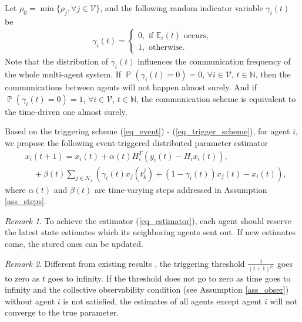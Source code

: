 \documentclass[10pt,journal,final]{IEEEtran}
\DeclareMathOperator{\Pro}{\mathbb{P}}
\theoremstyle{plain}
\theoremstyle{definition}
\theoremstyle{remark}
\newtheorem{remark}{Remark}[section]
\begin{document}
Let $\rho_0=\min\{\rho_j,\forall j\in\mathcal{V}\}$, and the following  random indicator variable $\gamma_i(t)$ be
\begin{align}\label{eq_trigger_scheme}
\gamma_i(t)=\begin{cases}
0, \text{ if } \mathbb{E}_{i}(t) \text{ occurs},\\
1, \text{ otherwise}.
\end{cases}
\end{align}
Note that the distribution of $\gamma_i(t)$ influences the communication frequency of the whole multi-agent system. If $\Pro(\gamma_i(t)=0)=0$, $\forall i\in\mathcal{V}$, $t\in\mathbb{N}$, then the communications between agents will not happen almost surely. And if $\Pro(\gamma_i(t)=0)=1$, $\forall i\in\mathcal{V}$, $t\in\mathbb{N}$, the communication scheme is equivalent  to the time-driven one almost surely.

Based on the triggering scheme (\ref{eq_event}) - (\ref{eq_trigger_scheme}),  for agent $i$, we propose the following event-triggered distributed parameter estimator
\begin{align}\label{eq_estimator}
&x_{i}(t+1)=x_{i}(t)+\alpha(t)  H_{i}^T( y_{i}(t)-H_{i}x_{i}(t)),\\
&\quad+\beta(t)\sum_{j\in\mathcal{N}_{i}}\left(\gamma_i(t)x_{j}(t_{k}^j)+(1-\gamma_i(t))x_{j}(t)-x_{i}(t)\right),\nonumber
\end{align}
where $\alpha(t)$ and $\beta(t)$ are time-varying steps addressed in  Assumption \ref{ass_steps}.

\begin{remark}
	To achieve the estimator (\ref{eq_estimator}), each agent should reserve the latest state estimates which its neighboring agents sent out. If new estimates come, the stored ones can be updated. 
\end{remark}
\begin{remark}
Different from existing results \cite{you2013asymptotically,shi2014event,mo2012kalman,sinopoli2004kalman,han2015optimal,han2015stochastic,weimer2012distributed,He2017On,battistelli2018distributed,he2017distributed}, the triggering threshold $\frac{1}{ (t+1)^{\rho_i}}$ goes to zero as $t$ goes to infinity. If the threshold does not go to zero as time goes to infinity and the collective observability condition (see Assumption \ref{ass_obser}) without agent $i$ is not satisfied, the estimates of all agents except agent $i$ will not converge to the true parameter. 
\end{remark}
\end{document}
